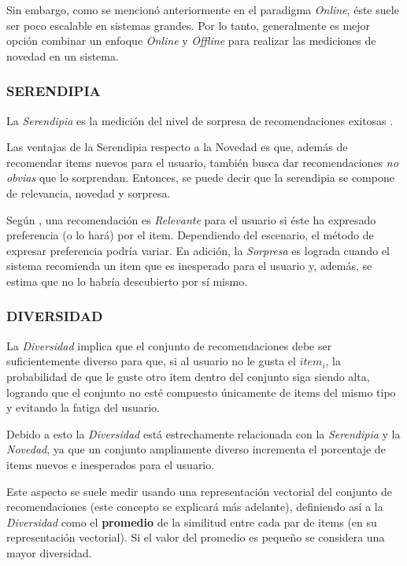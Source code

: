     Sin embargo, como se mencionó anteriormente en el paradigma \textit{Online}, éste suele ser poco escalable en sistemas grandes. Por lo tanto, generalmente es mejor opción combinar un enfoque \textit{Online} y \textit{Offline} para realizar las mediciones de novedad en un sistema.

    \subsubsection{SERENDIPIA}

    La \textit{Serendipia} es la medición del nivel de sorpresa de recomendaciones exitosas \parencite{Aggarwal2016}. 
    
    Las ventajas de la Serendipia respecto a la Novedad es que, además de recomendar items nuevos para el usuario, también busca dar recomendaciones \textit{no obvias} que lo sorprendan. Entonces, se puede decir que la serendipia se compone de relevancia, novedad y sorpresa.
    
    Según \parencite{Kotkov2020Serendipity}, una recomendación es \textit{Relevante} para el usuario si éste ha expresado preferencia (o lo hará) por el item. Dependiendo del escenario, el método de expresar preferencia podría variar. En adición, la \textit{Sorpresa} es lograda cuando el sistema recomienda un item que es inesperado para el usuario y, además, se estima que no lo habría descubierto por sí mismo.

    \newpage

    \subsubsection{DIVERSIDAD}

    La \textit{Diversidad} implica que el conjunto de recomendaciones debe ser suficientemente diverso para que, si al usuario no le gusta el $item_i$, la probabilidad de que le guste otro item dentro del conjunto siga siendo alta, logrando que el conjunto no esté compuesto únicamente de items del mismo tipo y evitando la fatiga del usuario. 
    
    Debido a esto la \textit{Diversidad} está estrechamente relacionada con la \textit{Serendipia} y la \textit{Novedad}, ya que un conjunto ampliamente diverso incrementa el porcentaje de items nuevos e inesperados para el usuario.
    
    Este aspecto se suele medir usando una representación vectorial del conjunto de recomendaciones (este concepto se explicará más adelante), definiendo así a la \textit{Diversidad} como el \textbf{promedio} de la similitud entre cada par de items (en su representación vectorial). Si el valor del promedio es pequeño se considera una mayor diversidad.
    
